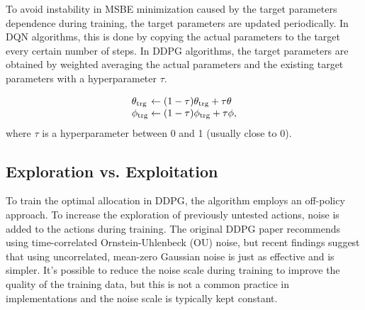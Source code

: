 To avoid instability in MSBE minimization caused by the target parameters dependence during training, the target parameters are updated periodically. In DQN algorithms, this is done by copying the actual parameters to the target every certain number of steps. In DDPG algorithms, the target parameters are obtained by weighted averaging the actual parameters and the existing target parameters with a hyperparameter $\tau$. 

\begin{equation}
\begin{array}{l@{}l}
\theta_{\text{trg}} &{}\leftarrow (1-\tau) \theta_{\text{trg}} + \tau\theta \\
\phi_{\text{trg}} &{}\leftarrow (1-\tau) \phi_{\text{trg}} + \tau\phi,

\end{array}
\end{equation}
where $\tau$ is a hyperparameter between 0 and 1 (usually close to 0). 




\subsection{Exploration vs. Exploitation}
To train the optimal allocation in DDPG, the algorithm employs an off-policy approach. To increase the exploration of previously untested actions, noise is added to the actions during training. The original DDPG paper recommends using time-correlated Ornstein-Uhlenbeck (OU) noise, but recent findings suggest that using uncorrelated, mean-zero Gaussian noise is just as effective and is simpler. It's possible to reduce the noise scale during training to improve the quality of the training data, but this is not a common practice in implementations and the noise scale is typically kept constant.
